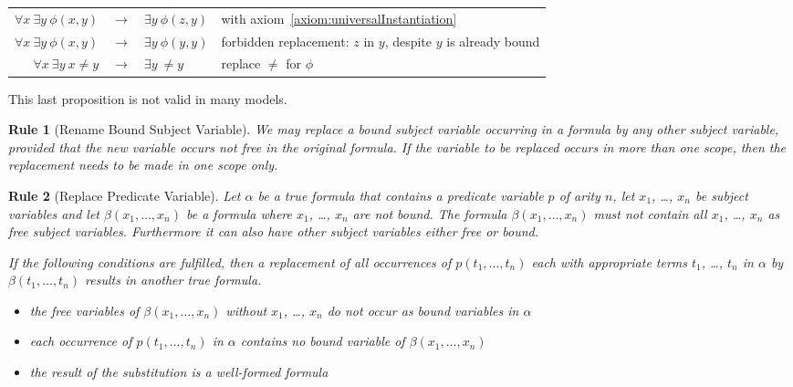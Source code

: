 \documentclass[a4paper,german,10pt,twoside]{book}
\newtheorem{rul}{Rule}
\theoremstyle{definition}
\theoremstyle{remark}
\begin{document}
\par
\begin{tabularx}{\linewidth}{rclX}
  $\forall x \ \exists y \ \phi(x, y)$ & $\rightarrow$ & $\exists y \ \phi(z,y)$ 
    & with axiom~\ref{axiom:universalInstantiation} \\
  $\forall x \ \exists y \ \phi(x, y)$ & $\rightarrow$ & $\exists y \ \phi(y,y)$ 
    & forbidden replacement: $z$ in $y$, despite $y$ is already bound \\
  $\forall x \ \exists y \ x \neq y$ & $\rightarrow$ & $\exists y \ \neq y$ 
    & replace $\neq$ for $\phi$
\end{tabularx}

\par
This last proposition is not valid in many models.


\par


\begin{rul}[Rename Bound Subject Variable]
\label{rule:renameBound} \hypertarget{rule:renameBound}{}
We may replace a bound subject variable occurring in a formula by any other subject variable, provided that the new variable occurs not free in the original formula. If the variable to be replaced occurs in more than one scope, then the replacement needs to be made in one scope only.
\end{rul}




\par


\begin{rul}[Replace Predicate Variable]
\label{rule:replacePred} \hypertarget{rule:replacePred}{}
Let $\alpha$ be a true formula that contains a predicate variable $p$ of arity $n$, let $x_1$, \ldots, $x_n$ be subject variables and let $\beta(x_1, \ldots, x_n)$ be a formula where $x_1$, \ldots, $x_n$ are not bound. The formula $\beta(x_1, \ldots, x_n)$ must not contain all $x_1$, \ldots, $x_n$ as free subject variables. Furthermore it can also have other subject variables either free or bound.

If the following conditions are fulfilled, then a replacement of all occurrences of $p(t_1, \ldots, t_n)$ each with appropriate terms $t_1$, \ldots, $t_n$ in $\alpha$ by $\beta(t_1, \ldots, t_n)$ results in another true formula.

\begin{itemize}

\item
the free variables of $\beta(x_1, \ldots, x_n)$ without $x_1$, \ldots, $x_n$ do not occur as bound variables in $\alpha$ 

\item 
each occurrence of $p(t_1, \ldots, t_n)$ in $\alpha$ contains no bound variable of $\beta(x_1, \ldots, x_n)$ 

\item
the result of the substitution is a well-formed formula

\end{itemize}
\end{rul}
\end{document}
